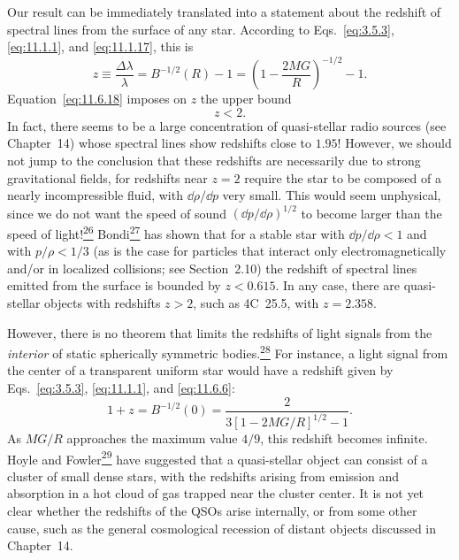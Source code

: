 Our result can be immediately translated into a statement about the redshift
of spectral lines from the surface of any star. According to
Eqs.~\eqref{eq:3.5.3}, \eqref{eq:11.1.1}, and \eqref{eq:11.1.17}, this is
\[
  z\equiv\frac{\Delta\lambda}{\lambda}
  =
  B^{-1/2}(R)-1
  =
  \left(1-\frac{2MG}{R}\right)^{-1/2}-1.
\]
Equation~\eqref{eq:11.6.18} imposes on \(z\) the upper bound
\begin{equation}
  z<2.
  \tag{11.6.20}\label{eq:11.6.20}
\end{equation}
In fact, there seems to be a large concentration of quasi-stellar radio
sources (see Chapter~14) whose spectral lines show redshifts close to \(1.95\)!
However, we should not jump to the conclusion that these redshifts are
necessarily due to strong gravitational fields, for redshifts near \(z=2\)
require the star to be composed of a nearly incompressible fluid, with
\(\dd\rho/\dd p\) very small. This would seem unphysical, since we do not want the
speed of sound \((\dd p/\dd\rho)^{1/2}\) to become larger than the speed of
light!\hyperref[ch11-ref-26]{\textsuperscript{26}}
Bondi\hyperref[ch11-ref-27]{\textsuperscript{27}} has shown that for a stable
star with \(\dd p/\dd\rho<1\) and with \(p/\rho<1/3\) (as is the case for
particles that interact only electromagnetically and/or in localized
collisions; see Section~2.10) the redshift of spectral lines emitted from the
surface is bounded by \(z<0.615\). In any case, there are quasi-stellar
objects with redshifts \(z>2\), such as 4C~25.5, with \(z=2.358\).

However, there is no theorem that limits the redshifts of light signals from
the \emph{interior} of static spherically symmetric
bodies.\hyperref[ch11-ref-28]{\textsuperscript{28}} For instance, a light
signal from the center of a transparent uniform star would have a redshift
given by Eqs.~\eqref{eq:3.5.3}, \eqref{eq:11.1.1}, and
\eqref{eq:11.6.6}:
\[
  1+z
  =
  B^{-1/2}(0)
  =
  \frac{2}{3[1-2MG/R]^{1/2}-1}.
\]
As \(MG/R\) approaches the maximum value \(4/9\), this redshift becomes
infinite. Hoyle and Fowler\hyperref[ch11-ref-29]{\textsuperscript{29}} have
suggested that a quasi-stellar object can consist of a cluster of small dense
stars, with the redshifts arising from emission and absorption in a hot cloud
of gas trapped near the cluster center. It is not yet clear whether the
redshifts of the QSOs arise internally, or from some other cause, such as the
general cosmological recession of distant objects discussed in Chapter~14.
